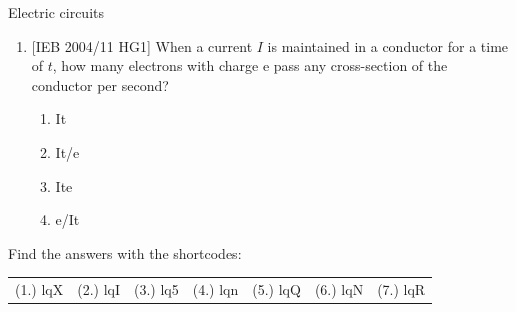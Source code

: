 \begin{eocexercises}{Electric circuits}
\begin{enumerate}[noitemsep, label=\textbf{\arabic*}. ]
{}

\item{[IEB 2004/11 HG1] When a current $I$ is maintained in a conductor for a time of $t$, how many electrons with charge e pass any cross-section of the conductor per second?
\begin{enumerate}[noitemsep, label=\textbf{\arabic*}. ] 
\item{It}
\item{It/e}
\item{Ite}
\item{e/It}
\end{enumerate}}

\end{enumerate}
\par {} Find the answers with the shortcodes:
 \par \begin{tabular}[h]{cccccc}
 (1.) lqX  &  (2.) lqI  &  (3.) lq5  &  (4.) lqn  &  (5.) lqQ  &  (6.) lqN  &  (7.) lqR   \end{tabular}
\end{eocexercises}